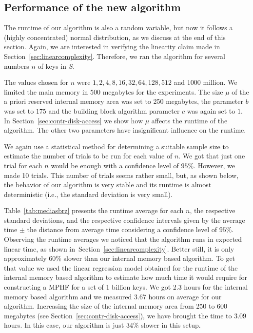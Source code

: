 \subsection{Performance of the new algorithm}
\label{sec:performance}

The runtime of our algorithm is also a random variable, but now it follows a
(highly concentrated) normal distribution, as we discuss at the end of this
section.  Again, we are interested in verifying the linearity claim made in
Section~\ref{sec:linearcomplexity}.  Therefore, we ran the algorithm for
several numbers $n$ of keys in $S$.

The values chosen for $n$ were $1, 2, 4, 8, 16, 32, 64, 128, 512$ and $1000$
million. 
We limited the main memory in 500 megabytes for the experiments.
The size $\mu$ of the a priori reserved internal memory area 
was set to 250 megabytes, the parameter $b$ was set to $175$ and
the building block algorithm parameter $c$ was again set to $1$.
In Section~\ref{sec:contr-disk-access} we show how $\mu$
affects the runtime of the algorithm. The other two parameters
have insignificant influence on the runtime.  

We again use a statistical method for determining a suitable sample size
to estimate the number of trials to be run for each value of $n$.  We got that
just one trial for each $n$ would be enough with a confidence level of $95\%$.
However, we made 10 trials.  This number of trials seems rather small, but, as
shown below, the behavior of our algorithm is very stable and its runtime is
almost deterministic (i.e., the standard deviation is very small).
 
Table~\ref{tab:mediasbrz} presents the runtime average for each $n$,
the respective standard deviations, and 
the respective confidence intervals given by 
the average time $\pm$ the distance from average time
considering a confidence level of $95\%$.
Observing the runtime averages we noticed that 
the algorithm runs in expected linear time, 
as shown in~Section~\ref{sec:linearcomplexity}.  Better still,
it is only approximately $60\%$  slower than our internal memory based algorithm.
To get that value we used the linear regression model obtained for the runtime of
the internal memory based algorithm to estimate how much time it would require
for constructing a MPHF for a set of 1 billion keys. 
We got 2.3 hours for the internal memory based algorithm  and we measured  
3.67 hours on average for our algorithm. 
Increasing the size of the internal memory area 
from 250 to 600 megabytes (see Section~\ref{sec:contr-disk-access}),
we have brought the time to 3.09 hours. In this case, our algorithm is 
just $34\%$  slower in this setup.

